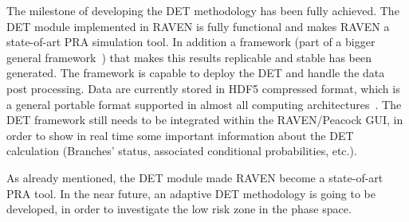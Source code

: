 \label{sec:conclusions}
The milestone of developing the DET methodology has been fully achieved. The DET module implemented in RAVEN is fully functional and makes RAVEN a state-of-art PRA simulation tool. In addition a framework (part of a bigger general framework~\cite{RAVENFY13}) that makes this results replicable and stable has been generated. The framework is capable to deploy the DET and handle the data post processing. Data are currently stored in HDF5 compressed format, which is a general portable format supported in almost all computing architectures~\cite{HDF5}. 
The DET framework still needs to be integrated within the RAVEN/Peacock GUI, in order to show in real time some important information about the DET calculation (Branches' status, associated conditional probabilities, etc.).

As already mentioned, the DET module made RAVEN become a state-of-art PRA tool. In the near future, an adaptive DET methodology is going to be developed, in order to investigate the low risk zone in the phase space.
  
